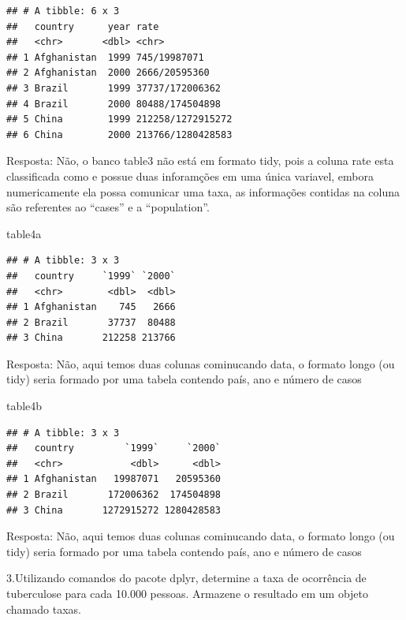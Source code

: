 \documentclass[
]{article}
\newenvironment{Shaded}{\begin{snugshade}}{\end{snugshade}}
\newcommand{\NormalTok}[1]{#1}
\begin{document}
\begin{verbatim}
## # A tibble: 6 x 3
##   country      year rate             
##   <chr>       <dbl> <chr>            
## 1 Afghanistan  1999 745/19987071     
## 2 Afghanistan  2000 2666/20595360    
## 3 Brazil       1999 37737/172006362  
## 4 Brazil       2000 80488/174504898  
## 5 China        1999 212258/1272915272
## 6 China        2000 213766/1280428583
\end{verbatim}

Resposta: Não, o banco table3 não está em formato tidy, pois a coluna
rate esta classificada como e possue duas inforamções em uma única
variavel, embora numericamente ela possa comunicar uma taxa, as
informações contidas na coluna são referentes ao ``cases'' e a
``population''.

\begin{Shaded}
\begin{Highlighting}[]
\NormalTok{table4a}
\end{Highlighting}
\end{Shaded}

\begin{verbatim}
## # A tibble: 3 x 3
##   country     `1999` `2000`
##   <chr>        <dbl>  <dbl>
## 1 Afghanistan    745   2666
## 2 Brazil       37737  80488
## 3 China       212258 213766
\end{verbatim}

Resposta: Não, aqui temos duas colunas cominucando data, o formato longo
(ou tidy) seria formado por uma tabela contendo país, ano e número de
casos

\begin{Shaded}
\begin{Highlighting}[]
\NormalTok{table4b}
\end{Highlighting}
\end{Shaded}

\begin{verbatim}
## # A tibble: 3 x 3
##   country         `1999`     `2000`
##   <chr>            <dbl>      <dbl>
## 1 Afghanistan   19987071   20595360
## 2 Brazil       172006362  174504898
## 3 China       1272915272 1280428583
\end{verbatim}

Resposta: Não, aqui temos duas colunas cominucando data, o formato longo
(ou tidy) seria formado por uma tabela contendo país, ano e número de
casos

3.Utilizando comandos do pacote dplyr, determine a taxa de ocorrência de
tuberculose para cada 10.000 pessoas. Armazene o resultado em um objeto
chamado taxas.
\end{document}
